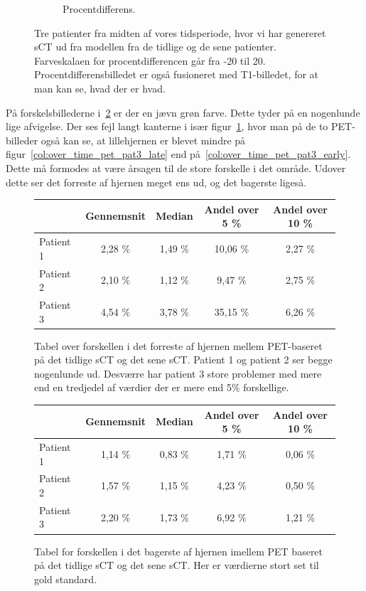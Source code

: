 \begin{figure}
\begin{subfigure}{0.3\textwidth}
        \caption{Procentdifferens.}
        \label{col:over_time_pet_pat3_pd}
    \end{subfigure}
    \caption{Tre patienter fra midten af vores tidsperiode, hvor vi har genereret sCT ud fra modellen fra de tidlige og de sene patienter. Farveskalaen for procentdifferencen går fra -20 til 20. Procentdifferensbilledet er også fusioneret med T1-billedet, for at man kan se, hvad der er hvad.}
    \label{col:over_time_pet}
\end{figure}



På forskelsbillederne i~\ref{col:over_time_pet} er der en jævn grøn farve.
Dette tyder på en nogenlunde lige afvigelse. Der ses fejl langt kanterne
i især figur~\ref{col:over_time_pet_pat3_pd}, hvor man på de to
PET-billeder også kan se, at lillehjernen er blevet mindre på
figur~\ref{col:over_time_pet_pat3_late} end
på~\ref{col:over_time_pet_pat3_early}. Dette må formodes at være
årsagen til de store forskelle i det område. Udover dette ser det forreste af
hjernen meget ens ud, og det bagerste ligeså.

\begin{figure}
    \centering
    \begin{tabular}{| l | c | c | c | c |}
        \hline
         & Gennemsnit & Median & Andel over 5 \% & Andel over 10 \% \\ \hline
        Patient 1 & 2,28 \% & 1,49 \% & 10,06 \% & 2,27 \% \\ \hline
        Patient 2 & 2,10 \% & 1,12 \% & 9,47 \% & 2,75 \% \\ \hline
        Patient 3 & 4,54 \% & 3,78 \% & 35,15 \% & 6,26 \% \\ \hline
    \end{tabular}
    \caption{Tabel over forskellen i det forreste af hjernen mellem PET-baseret på det tidlige sCT og det sene sCT. Patient 1 og patient 2 ser begge nogenlunde ud. Desværre har patient 3 store problemer med mere end en tredjedel af værdier der er mere end 5\% forskellige.}
    \label{tab:over_tid_forresthjerne}
\end{figure}

\begin{figure}
    \centering
    \begin{tabular}{| l | c | c | c | c |}
        \hline
         & Gennemsnit & Median & Andel over 5 \% & Andel over 10 \% \\ \hline
        Patient 1 & 1,14 \% & 0,83 \% & 1,71 \% & 0,06 \% \\ \hline
        Patient 2 & 1,57 \% & 1,15 \% & 4,23 \% & 0,50 \% \\ \hline
        Patient 3 & 2,20 \% & 1,73 \% & 6,92 \% & 1,21 \% \\ \hline
    \end{tabular}
    \caption{Tabel for forskellen i det bagerste af hjernen imellem PET baseret på det tidlige sCT og det sene sCT. Her er værdierne stort set til gold standard.}
    \label{tab:over_tid_bagersthjerne}
\end{figure}

